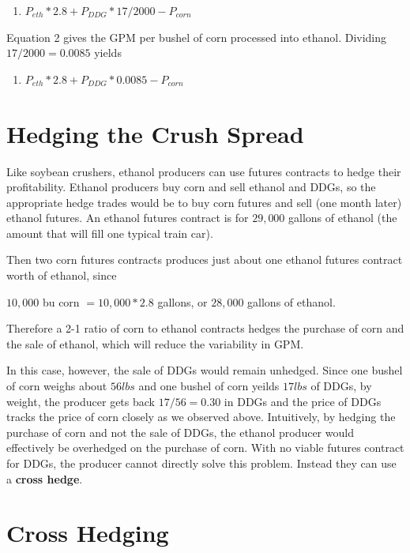 \documentclass[
]{book}
\providecommand{\tightlist}{%
  \setlength{\itemsep}{0pt}\setlength{\parskip}{0pt}}
\begin{document}
\begin{enumerate}
\def\labelenumi{\arabic{enumi}.}
\setcounter{enumi}{1}
\tightlist
\item
  \(P_{eth}*2.8 + P_{DDG}*17/2000 - P_{corn}\)
\end{enumerate}

Equation 2 gives the GPM per bushel of corn processed into ethanol. Dividing \(17/2000 = 0.0085\) yields

\begin{enumerate}
\def\labelenumi{\arabic{enumi}.}
\setcounter{enumi}{2}
\tightlist
\item
  \(P_{eth}*2.8 + P_{DDG}*0.0085 - P_{corn}\)
\end{enumerate}

\hypertarget{hedging-the-crush-spread}{%
\section{Hedging the Crush Spread}\label{hedging-the-crush-spread}}

Like soybean crushers, ethanol producers can use futures contracts to hedge their profitability. Ethanol producers buy corn and sell ethanol and DDGs, so the appropriate hedge trades would be to buy corn futures and sell (one month later) ethanol futures. An ethanol futures contract is for \(29,000\) gallons of ethanol (the amount that will fill one typical train car).

Then two corn futures contracts produces just about one ethanol futures contract worth of ethanol, since

\(10,000\) bu corn \(= 10,000*2.8\) gallons, or \(28,000\) gallons of ethanol.

Therefore a 2-1 ratio of corn to ethanol contracts hedges the purchase of corn and the sale of ethanol, which will reduce the variability in GPM.

In this case, however, the sale of DDGs would remain unhedged. Since one bushel of corn weighs about \(56lbs\) and one bushel of corn yeilds \(17lbs\) of DDGs, by weight, the producer gets back \(17/56 = 0.30\) in DDGs and the price of DDGs tracks the price of corn closely as we observed above. Intuitively, by hedging the purchase of corn and not the sale of DDGs, the ethanol producer would effectively be overhedged on the purchase of corn. With no viable futures contract for DDGs, the producer cannot directly solve this problem. Instead they can use a \textbf{cross hedge}.

\hypertarget{cross-hedging}{%
\section{Cross Hedging}\label{cross-hedging}}
\end{document}

